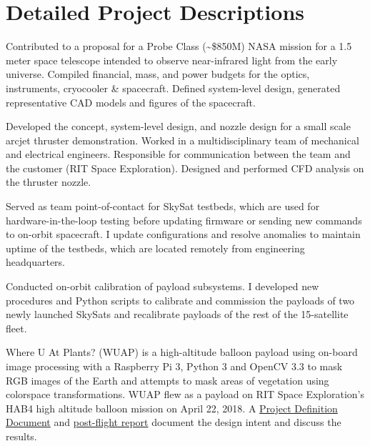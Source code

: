\documentclass[10pt,final,sans]{resume}
\begin{document}
\break
\section{Detailed Project Descriptions}

Contributed to a proposal for a Probe Class (\textasciitilde\$850M) NASA mission
for a 1.5 meter space telescope intended to observe near-infrared light from the
early universe. Compiled financial, mass, and power budgets for the optics,
instruments, cryocooler \& spacecraft. Defined system-level design, generated
representative CAD models and figures of the spacecraft.

Developed the concept, system-level design, and nozzle design for a small scale
arcjet thruster demonstration. Worked in a multidisciplinary team of mechanical
and electrical engineers. Responsible for communication between the team and the
customer (RIT Space Exploration). Designed and performed CFD analysis on the
thruster nozzle.

Served as team point-of-contact for SkySat testbeds, which are used for
hardware-in-the-loop testing before updating firmware or sending new commands to
on-orbit spacecraft. I update configurations and resolve anomalies to maintain
uptime of the testbeds, which are located remotely from engineering
headquarters.

Conducted on-orbit calibration of payload subsystems. I developed new procedures
and Python scripts to calibrate and commission the payloads of two newly
launched SkySats and recalibrate payloads of the rest of the 15-satellite fleet.

Where U At Plants? (WUAP) is a high-altitude balloon payload using on-board
image processing with a Raspberry Pi 3, Python 3 and OpenCV 3.3 to mask RGB
images of the Earth and attempts to mask areas of vegetation using colorspace
transformations. WUAP flew as a payload on RIT Space Exploration's HAB4 high
altitude balloon mission on April 22, 2018. A
\href{https://github.com/RIT-Space-Exploration/hab-cv/blob/master/reports/Project%20Definition%20Document/hab-cv.pdf}{Project
Definition Document} and
\href{https://github.com/RIT-Space-Exploration/hab-cv/blob/master/reports/HAB4%20Post%20Flight%20Report/report_wuap_postflight-hab4.md}{post-flight
report} document the design intent and discuss the results.
\end{document}
